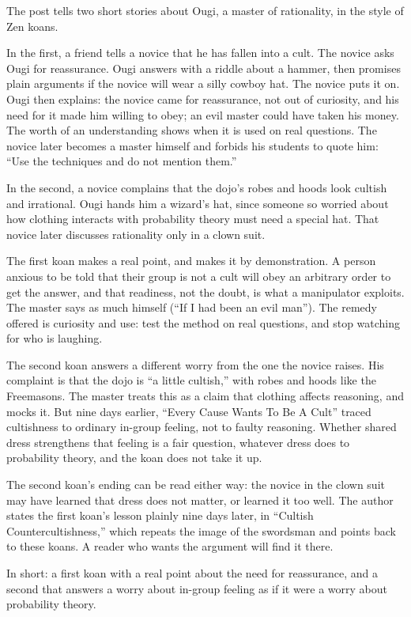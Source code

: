 \begin{afterword}
\summaryhead

The post tells two short stories about Ougi, a master of rationality, in the style of Zen koans.

In the first, a friend tells a novice that he has fallen into a cult. The novice asks Ougi for reassurance. Ougi answers with a riddle about a hammer, then promises plain arguments if the novice will wear a silly cowboy hat. The novice puts it on. Ougi then explains: the novice came for reassurance, not out of curiosity, and his need for it made him willing to obey; an evil master could have taken his money. The worth of an understanding shows when it is used on real questions. The novice later becomes a master himself and forbids his students to quote him: ``Use the techniques and do not mention them.''

In the second, a novice complains that the dojo's robes and hoods look cultish and irrational. Ougi hands him a wizard's hat, since someone so worried about how clothing interacts with probability theory must need a special hat. That novice later discusses rationality only in a clown suit.

\responsehead

The first koan makes a real point, and makes it by demonstration. A person anxious to be told that their group is not a cult will obey an arbitrary order to get the answer, and that readiness, not the doubt, is what a manipulator exploits. The master says as much himself (``If I had been an evil man''). The remedy offered is curiosity and use: test the method on real questions, and stop watching for who is laughing.

The second koan answers a different worry from the one the novice raises. His complaint is that the dojo is ``a little cultish,'' with robes and hoods like the Freemasons. The master treats this as a claim that clothing affects reasoning, and mocks it. But nine days earlier, ``Every Cause Wants To Be A Cult'' traced cultishness to ordinary in-group feeling, not to faulty reasoning. Whether shared dress strengthens that feeling is a fair question, whatever dress does to probability theory, and the koan does not take it up.

The second koan's ending can be read either way: the novice in the clown suit may have learned that dress does not matter, or learned it too well. The author states the first koan's lesson plainly nine days later, in ``Cultish Countercultishness,'' which repeats the image of the swordsman and points back to these koans. A reader who wants the argument will find it there.

In short: a first koan with a real point about the need for reassurance, and a second that answers a worry about in-group feeling as if it were a worry about probability theory.
\end{afterword}
